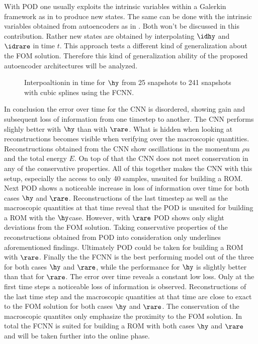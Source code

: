 With POD one usually exploits the intrinsic variables within a Galerkin framework as in \cite{Bernard} to produce new states. The same can be done with the intrinsic variables obtained from autoencoders as in \cite{Carlberg}. Both won't be discussed in this contribution. Rather new states are obtained by interpolating \(\idhy\) and \(\idrare\) in time \(t\). This approach tests a different kind of generalization about the FOM solution. Therefore this kind of generalization ability of the proposed autoencoder architectures will be analyzed.
\begin{figure}[H]
	
	\caption{Interpoaltionin in time for \(\hy\) from 25 snapshots to 241 snapshots with cubic splines using the FCNN.}
\end{figure}
In conclusion the error over time for the CNN is disordered, showing gain and subsequent loss of information from one timestep to another. The CNN performs slighly better with \(\hy\) than with \(\rare\). What is hidden when looking at reconstructions becomes visible when verifying over the macroscopic quantities. Reconstructions obtained from the CNN show oscillations in the momentum \(\rho u\) and the total energy \(E\). On top of that the CNN does not meet conservation in any of the conservative properties. All of this together makes the CNN with this setup, especially the access to only 40 samples, unsuited for building a ROM. Next POD shows a noticeable increase in loss of information over time for both cases \(\hy\) and \(\rare\). Reconstructions of the last timestep as well as the macroscopic quantities at that time reveal that the POD is unsuited for building a ROM with the \(\hy\)case. However, with \(\rare\) POD shows only slight deviations from the FOM solution. Taking conservative properties of the reconstructions obtained from POD into consideration only underlines aforementioned findings. Ultimately POD could be taken for building a ROM with \(\rare\). Finally the the FCNN is the best performing model out of the three for both cases \(\hy\) and \(\rare\), while the performance for \(\hy\) is slightly better than that for \(\rare\). The error over time reveals a constant low loss. Only at the first time steps a noticeable loss of information is observed. Reconstructions of the last time step and the macroscopic quantities at that time are close to exact to the FOM solution for both cases \(\hy\) and \(\rare\). The conservation of the macroscopic quantites only emphasize the proximity to the FOM solution. In total the FCNN is suited for building a ROM with both cases \(\hy\) and \(\rare\) and will be taken further into the online phase.\\
